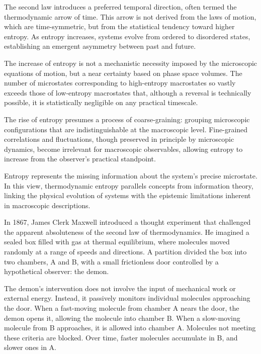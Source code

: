 The second law introduces a preferred temporal direction, often termed the thermodynamic arrow of time. This arrow is not derived from the laws of motion, which are time-symmetric, but from the statistical tendency toward higher entropy. As entropy increases, systems evolve from ordered to disordered states, establishing an emergent asymmetry between past and future.

The increase of entropy is not a mechanistic necessity imposed by the microscopic equations of motion, but a near certainty based on phase space volumes. The number of microstates corresponding to high-entropy macrostates so vastly exceeds those of low-entropy macrostates that, although a reversal is technically possible, it is statistically negligible on any practical timescale.

The rise of entropy presumes a process of coarse-graining: grouping microscopic configurations that are indistinguishable at the macroscopic level. Fine-grained correlations and fluctuations, though preserved in principle by microscopic dynamics, become irrelevant for macroscopic observables, allowing entropy to increase from the observer's practical standpoint.

Entropy represents the missing information about the system's precise microstate. In this view, thermodynamic entropy parallels concepts from information theory, linking the physical evolution of systems with the epistemic limitations inherent in macroscopic descriptions.

In 1867, James Clerk Maxwell introduced a thought experiment that challenged the apparent absoluteness of the second law of thermodynamics. He imagined a sealed box filled with gas at thermal equilibrium, where molecules moved randomly at a range of speeds and directions. A partition divided the box into two chambers, A and B, with a small frictionless door controlled by a hypothetical observer: the demon.

The demon's intervention does not involve the input of mechanical work or external energy. Instead, it passively monitors individual molecules approaching the door. When a fast-moving molecule from chamber A nears the door, the demon opens it, allowing the molecule into chamber B. When a slow-moving molecule from B approaches, it is allowed into chamber A. Molecules not meeting these criteria are blocked. Over time, faster molecules accumulate in B, and slower ones in A.

